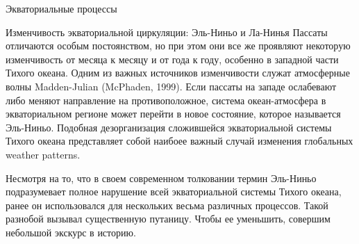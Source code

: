\begin{chapter}{Экваториальные процессы}
\begin{section}{Изменчивость экваториальной циркуляции: Эль-Ниньо и Ла-Нинья}\label{sec:ElNino}
%
%
Пассаты отличаются особым постоянством, но при этом они все же проявляют
некоторую изменчивость от месяца к месяцу и от года к году, особенно в западной
части Тихого океана. Одним из важных источников изменчивости служат атмосферные 
волны Madden-Julian (McPhaden, 1999). Если пассаты на западе ослабевают либо
меняют направление на противоположное, система океан-атмосфера в 
экваториальном регионе может перейти в новое состояние, которое называется
Эль-Ниньо. Подобная дезорганизация сложившейся экваториальной системы Тихого 
океана представляет собой наибоее важный случай изменения глобальных
weather patterns.
%

Несмотря на то, что в своем современном толковании термин Эль-Ниньо 
подразумевает полное нарушение всей экваториальной системы Тихого океана, 
ранее он использовался для нескольких весьма различных процессов. Такой
разнобой вызывал существенную путаницу. Чтобы ее уменьшить, совершим 
небольшой экскурс в историю.
%


\end{section}
\end{chapter}
